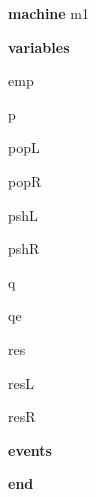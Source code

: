 \begin{block}
  \item   \textbf{machine} m1
  \item   \textbf{variables}
  \begin{block}
    \item   emp
    \item   p
    \item   popL
    \item   popR
    \item   pshL
    \item   pshR
    \item   q
    \item   qe
    \item   res
    \item   resL
    \item   resR
  \end{block}
  \item   
  \item   
  \item   \textbf{events}
  \begin{block}
    \item   
    \item   
    \item   
    \item   
    \item   
    \item   
  \end{block}
  \item   \textbf{end} \\
\end{block}
